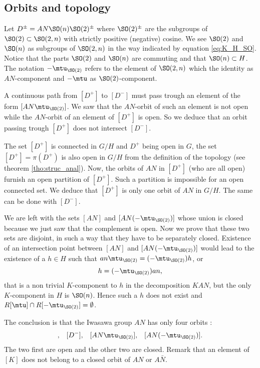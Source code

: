 \subsection{Orbits  and topology}
\label{PgTopoOrb}

Let  $D^{\pm}=AN\SO(n)\SO(2)^{\pm}$ where $\SO(2)^{\pm}$ are the subgroups of $\SO(2)\subset \SO(2,n)$ with strictly positive (negative) cosine. We see $\SO(2)$ and $\SO(n)$ as subgroups of $\SO(2,n)$ in the way indicated by equation \eqref{eq:K_H_SO}. Notice that the parts $\SO(2)$ and $\SO(n)$ are commuting and that $\SO(n)\subset H$. The notation $-\mtu_{\SO(2)}$ refers to the element of $\SO(2,n)$ which the identity as $AN$-component and $-\mtu$ as $\SO(2)$-component.

A continuous path from $[D^+]$ to $[D^-]$ must pass trough an element of the form $[AN\mtu_{\SO(2)}]$. We saw that the $AN$-orbit of such an element is not open while the $AN$-orbit of an element of $[D^+]$ is open. So we deduce that an orbit passing trough $[D^+]$ does not intersect $[D^-]$.

The set $[D^+]$ is connected in $G/H$ and $D^+$  being open in $G$, the set $[D^+]=\pi(D^+)$ is also open in $G/H$ from the definition of the topology (see theorem \ref{tho:struc_anal}). Now, the orbits of $AN$ in $[D^+]$ (who are all open) furnish an open partition of $[D^+]$. Such a partition is impossible for an open connected set. We deduce that $[D^+]$ is only one orbit of $AN$ in $G/H$. The same can be done with $[D^-]$.

We are left with the sets $[AN]$ and $[AN(-\mtu_{\SO(2)})]$ whose union is closed because we just saw that the complement is open. Now we prove that these two sets are disjoint, in such a way that they have to be separately closed. Existence of an intersection point between $[AN]$ and $[AN(-\mtu_{\SO(2)})]$ would lead to the existence of a $h\in H$ such that $an\mtu_{\SO(2)}=(-\mtu_{\SO(2)})h$, or
\[ 
  h=(-\mtu_{\SO(2)})an,
\]
that is a non trivial $K$-component to $h$ in the decomposition $KAN$, but the only $K$-component in $H$ is $\SO(n)$. Hence such a $h$ does not exist and $R[\mtu]\cap R[-\mtu_{\SO(2)}]=\emptyset$.

The conclusion is that the Iwasawa group $AN$ has only four orbits :
\begin{align}
[D^+],&&[D^-],&&[AN\mtu_{\SO(2)}],&&[AN(-\mtu_{\SO(2)})].
\end{align}
The two first are open and the other two are closed. Remark\label{PgNoticeKpassung} that an element of $[K]$ does not belong to a closed orbit of $AN$ or $A\bar N$.


